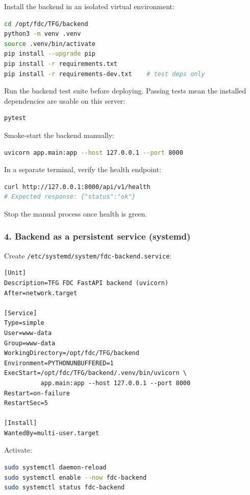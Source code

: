 \documentclass[11pt,a4paper]{article}
\begin{document}
Install the backend in an isolated virtual environment:

\begin{lstlisting}[language=bash]
cd /opt/fdc/TFG/backend
python3 -m venv .venv
source .venv/bin/activate
pip install --upgrade pip
pip install -r requirements.txt
pip install -r requirements-dev.txt    # test deps only
\end{lstlisting}

Run the backend test suite before deploying. Passing tests mean the installed
dependencies are usable on this server:

\begin{lstlisting}[language=bash]
pytest
\end{lstlisting}

Smoke-start the backend manually:

\begin{lstlisting}[language=bash]
uvicorn app.main:app --host 127.0.0.1 --port 8000
\end{lstlisting}

In a separate terminal, verify the health endpoint:

\begin{lstlisting}[language=bash]
curl http://127.0.0.1:8000/api/v1/health
# Expected response: {"status":"ok"}
\end{lstlisting}

Stop the manual process once health is green.

\subsubsection{4. Backend as a persistent service (systemd)}

Create \texttt{/etc/systemd/system/fdc-backend.service}:

\begin{lstlisting}
[Unit]
Description=TFG FDC FastAPI backend (uvicorn)
After=network.target

[Service]
Type=simple
User=www-data
Group=www-data
WorkingDirectory=/opt/fdc/TFG/backend
Environment=PYTHONUNBUFFERED=1
ExecStart=/opt/fdc/TFG/backend/.venv/bin/uvicorn \
          app.main:app --host 127.0.0.1 --port 8000
Restart=on-failure
RestartSec=5

[Install]
WantedBy=multi-user.target
\end{lstlisting}

Activate:

\begin{lstlisting}[language=bash]
sudo systemctl daemon-reload
sudo systemctl enable --now fdc-backend
sudo systemctl status fdc-backend
\end{lstlisting}
\end{document}
